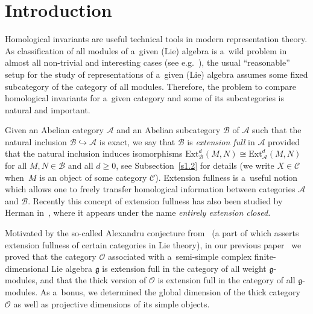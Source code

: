 \documentclass[pdftex]{sigma}
\begin{document}

\renewcommand{\thefootnote}{\arabic{footnote}}
\setcounter{footnote}{0}

\section{Introduction}%

Homological invariants are useful technical tools in modern representation theory.
As classif\/ication of all modules of a~given (Lie) algebra is a~wild problem in almost all non-trivial and interesting
cases (see e.g.~\cite{BKM, Dr,FNP}), the usual ``reasonable'' setup for the study of representations of a~given (Lie)
algebra assumes some f\/ixed subcategory of the category of all modules.
Therefore, the problem to compare homological invariants for a~given category and some of its subcategories is natural
and important.

Given an Abelian category $\mathcal{A}$ and an Abelian subcategory $\mathcal{B}$ of $\mathcal{A}$ such that the natural
inclusion $\mathcal{B}\hookrightarrow \mathcal{A}$ is exact, we say that $\mathcal{B}$ is {\em extension full} in
$\mathcal{A}$ provided that the natural inclusion induces isomorphisms
$\mathrm{Ext}_{\mathcal{B}}^d(M,N)\cong\mathrm{Ext}_{\mathcal{A}}^d(M,N)$ for all $M,N\in \mathcal{B}$ and all $d\geq
0$, see Subsection~\ref{s1.2} for details (we write $X\in\mathcal{C}$ when~$M$ is an object of some category
$\mathcal{C}$).
Extension fullness is a~useful notion which allows one to freely transfer homological information between categories
$\mathcal{A}$ and $\mathcal{B}$.
Recently this concept of extension fullness has also been studied by Herman in~\cite{He}, where it appears under the
name {\em entirely extension closed.}

Motivated by the so-called Alexandru conjecture from~\cite{Fu,Ga} (a part of which asserts extension fullness of certain
categories in Lie theory), in our previous paper~\cite{CoMa} we proved that the category $\mathcal{O}$ associated with
a~semi-simple complex f\/inite-dimensional Lie algebra $\mathfrak{g}$ is extension full in the category of all weight
$\mathfrak{g}$-modules, and that the thick version of $\mathcal{O}$ is extension full in the category of all
$\mathfrak{g}$-modules.
As a~bonus, we determined the global dimension of the thick category $\mathcal{O}$ as well as projective dimensions of
its simple objects.
\end{document}
